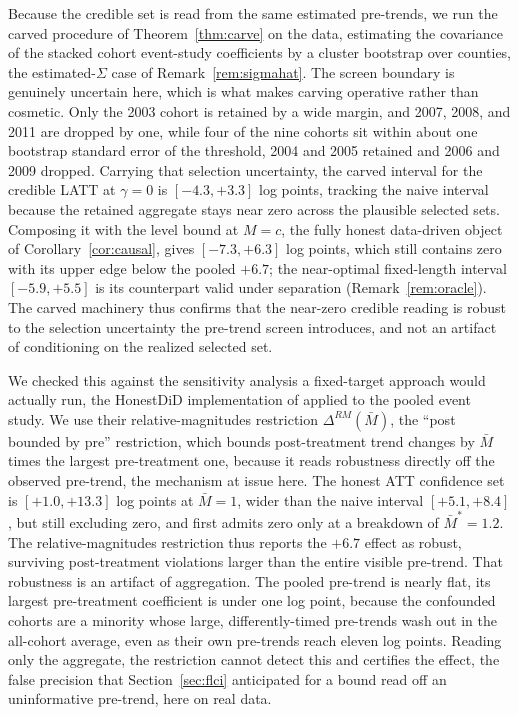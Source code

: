 \documentclass[12pt]{article}
\theoremstyle{remark}
\begin{document}
Because the credible set is read from the same estimated pre-trends, we run the carved procedure of
Theorem~\ref{thm:carve} on the data, estimating the covariance of the stacked cohort event-study
coefficients by a cluster bootstrap over counties, the estimated-$\Sigma$ case of
Remark~\ref{rem:sigmahat}. The screen boundary is genuinely uncertain here, which is what makes carving
operative rather than cosmetic. Only the 2003 cohort is retained by a wide margin, and 2007, 2008, and
2011 are dropped by one, while four of the nine cohorts sit within about one bootstrap standard error of
the threshold, 2004 and 2005 retained and 2006 and 2009 dropped. Carrying that selection uncertainty, the
carved interval for the credible LATT at $\gamma=0$ is $[-4.3,+3.3]$ log points, tracking the naive
interval because the retained aggregate stays near zero across the plausible selected sets. Composing it
with the level bound at $M=c$, the fully honest data-driven object of Corollary~\ref{cor:causal}, gives
$[-7.3,+6.3]$ log points, which still contains zero with its upper edge below the pooled $+6.7$; the
near-optimal fixed-length interval $[-5.9,+5.5]$ is its counterpart valid under separation
(Remark~\ref{rem:oracle}). The carved machinery thus confirms that the near-zero credible reading is robust
to the selection uncertainty the pre-trend screen introduces, and not an artifact of conditioning on the
realized selected set.

We checked this against the sensitivity analysis a fixed-target approach would actually run, the HonestDiD
implementation of \citet{rambachan2023} applied to the pooled event study. We use their relative-magnitudes
restriction $\Delta^{RM}(\bar M)$, the ``post bounded by pre'' restriction, which
bounds post-treatment trend changes by $\bar M$ times the largest
pre-treatment one, because it reads robustness directly off the observed pre-trend, the mechanism at issue
here. The honest ATT confidence set is $[+1.0,+13.3]$ log points at $\bar M=1$, wider than the
naive interval $[+5.1,+8.4]$, but still excluding zero, and first admits zero only at a breakdown of
$\bar M^\ast=1.2$. The relative-magnitudes restriction thus reports the $+6.7$
effect as robust, surviving post-treatment violations larger than the entire visible pre-trend. That
robustness is an artifact of aggregation. The pooled pre-trend is nearly flat, its largest pre-treatment
coefficient is under one log point, because the confounded cohorts are a minority whose large,
differently-timed pre-trends wash out in the all-cohort average, even as their own pre-trends reach eleven log
points. Reading only the aggregate, the restriction cannot detect this and certifies the effect, the false
precision that Section~\ref{sec:flci} anticipated for a bound read off an uninformative pre-trend, here on
real data.
\end{document}
